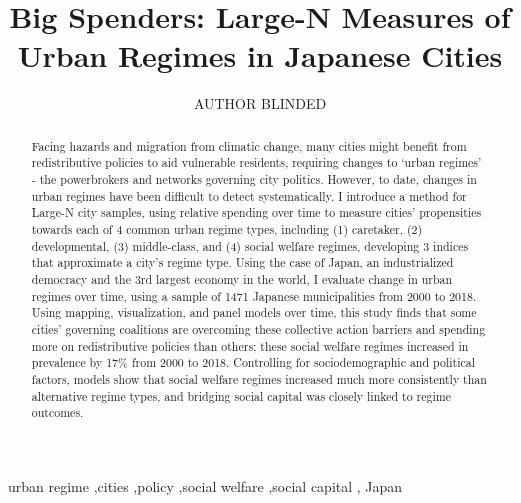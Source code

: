 \documentclass[preprint, 3p,
authoryear]{elsarticle} %
\begin{document}
\begin{frontmatter}

  \title{Big Spenders: Large-N Measures of Urban Regimes in Japanese
Cities}
    \author[UNIVERSITY BLINDED]{AUTHOR BLINDED%
  }
  
  \begin{abstract}
  Facing hazards and migration from climatic change, many cities might
  benefit from redistributive policies to aid vulnerable residents,
  requiring changes to `urban regimes' - the powerbrokers and networks
  governing city politics. However, to date, changes in urban regimes
  have been difficult to detect systematically. I introduce a method for
  Large-N city samples, using relative spending over time to measure
  cities' propensities towards each of 4 common urban regime types,
  including (1) caretaker, (2) developmental, (3) middle-class, and (4)
  social welfare regimes, developing 3 indices that approximate a city's
  regime type. Using the case of Japan, an industrialized democracy and
  the 3rd largest economy in the world, I evaluate change in urban
  regimes over time, using a sample of 1471 Japanese municipalities from
  2000 to 2018. Using mapping, visualization, and panel models over
  time, this study finds that some cities' governing coalitions are
  overcoming these collective action barriers and spending more on
  redistributive policies than others; these social welfare regimes
  increased in prevalence by 17\% from 2000 to 2018. Controlling for
  sociodemographic and political factors, models show that social
  welfare regimes increased much more consistently than alternative
  regime types, and bridging social capital was closely linked to regime
  outcomes.
  \end{abstract}
    \begin{keyword}
    urban regime \sep cities \sep policy \sep social welfare \sep social
capital \sep 
    Japan
  \end{keyword}
  
 \end{frontmatter}

\captionsetup[table]{labelformat=empty}
\captionsetup[figure]{labelformat=empty}
\captionsetup{font=large}
\end{document}
